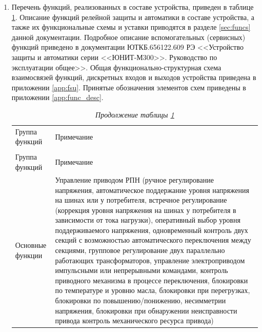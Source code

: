 \begin{enumerate}

\item
Перечень функций, реализованных в составе устройства, приведен в таблице \ref{desc:tbl1}. Описание функций релейной защиты и автоматики в составе устройства, а также их функциональные схемы и уставки приводятся в разделе \ref{sec:funcs} данной документации. Подробное описание вспомогательных (сервисных) функций приведено в документации ЮТКБ.656122.609 РЭ <<Устройство защиты и автоматики серии <<ЮНИТ-М300>>. Руководство по эксплуатации общее>>. Общая функционально-структурная схема взаимосвязей функций, дискретных входов и выходов устройства приведена в приложении \ref{app:fsu}. Принятые обозначения элементов схем приведены в приложении \ref{app:func_desc}. 

\setlength{\extrarowheight}{0.05cm} %
\small
\begin{longtable}
{|>{\centering\arraybackslash}m{3.0cm}|>{\centering\arraybackslash}m{13.9cm}|}
\caption{Функции в составе устройства <<ЮНИТ-М300-АРНТ>>\hfill\vspace{-0.5\baselineskip}}\label{desc:tbl1}\\ 
\hhline{|-|-|}
\rowcolor{gray!30}
Группа функций & Примечание \\ 
\hhline{|-|-|}
\endfirsthead

\caption*{\hspace{3pt}\emph{Продолжение таблицы \ref{desc:tbl1}\hfill\vspace{-0.5\baselineskip}}} \\ %
\hhline{|-|-|}
\rowcolor{gray!30}
Группа функций & Примечание \\ 
\hhline{|-|-|}
\endhead
\hhline{|-|-|}

\endfoot
\endlastfoot

Основные функции & \raggedright\arraybackslash 
Управление приводом РПН (ручное регулирование напряжения,
 автоматическое поддержание уровня напряжения на шинах или у потребителя,
 встречное регулирование (коррекция уровня напряжения на  шинах у потребителя в зависимости от тока нагрузки),
  оперативный выбор уровня поддерживаемого напряжения,
  одновременный контроль двух секций с возможностью автоматического переключения между секциями,
 групповое регулирование двух параллельно работающих трансформаторов,
 управление электроприводом импульсными или непрерывными командами,
  контроль приводного механизма в процессе переключения,
 блокировки по температуре и уровню масла,
 блокировки при перегрузках,
  блокировки по повышению/понижению, несимметрии напряжения,
  блокировки при обнаружении неисправности привода
 контроль механического ресурса привода)


\end{longtable}
\end{enumerate}
